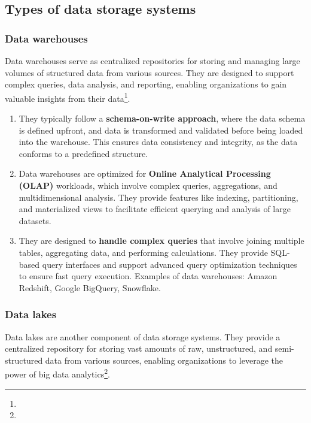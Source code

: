 \subsection{Types of data storage systems}

\subsubsection{Data warehouses}

Data warehouses serve as centralized repositories for storing and managing large volumes of structured data from various sources. They are designed to support complex queries, data analysis, and reporting, enabling organizations to gain valuable insights from their data\footnote[20]{}.

\begin{enumerate}
    \item They typically follow a \textbf{schema-on-write approach}, where the data schema is defined upfront, and data is transformed and validated before being loaded into the warehouse. This ensures data consistency and integrity, as the data conforms to a predefined structure\footnotemark[20].
    \item Data warehouses are optimized for \textbf{Online Analytical Processing (OLAP)} workloads, which involve complex queries, aggregations, and multidimensional analysis. They provide features like indexing, partitioning, and materialized views to facilitate efficient querying and analysis of large datasets\footnotemark[20].
    \item They are designed to \textbf{handle complex queries} that involve joining multiple tables, aggregating data, and performing calculations. They provide SQL-based query interfaces and support advanced query optimization techniques to ensure fast query execution. Examples of data warehouses: Amazon Redshift, Google BigQuery, Snowflake\footnotemark[20].
\end{enumerate}

\subsubsection{Data lakes}

Data lakes are another component of data storage systems. They provide a centralized repository for storing vast amounts of raw, unstructured, and semi-structured data from various sources, enabling organizations to leverage the power of big data analytics\footnote[20]{}.

